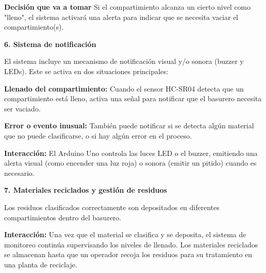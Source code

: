 	\textbf{Decisión que va a tomar} Si el compartimiento alcanza un cierto nivel como "lleno", el sistema activará una alerta para indicar que se necesita vaciar el compartimiento(s). 

	\textbf{6. Sistema de notificación} 

El sistema incluye un mecanismo de notificación visual y/o sonora (buzzer y LEDs). Este se activa en dos situaciones principales: 

    \textbf{Llenado del compartimiento:} Cuando el sensor HC-SR04 detecta que un compartimiento está lleno, activa una señal para notificar que el basurero necesita ser vaciado. 

	\textbf{Error o evento inusual:} También puede notificar si se detecta algún material que no puede clasificarse, o si hay algún error en el proceso. 

	\textbf{Interacción:} El Arduino Uno controla las luces LED o el buzzer, emitiendo una alerta visual (como encender una luz roja) o sonora (emitir un pitido) cuando es necesario. 

	\textbf{7. Materiales reciclados y gestión de residuos} 

Los residuos clasificados correctamente son depositados en diferentes compartimientos dentro del basurero. 

    \textbf{Interacción:} Una vez que el material se clasifica y se deposita, el sistema de monitoreo continúa supervisando los niveles de llenado. Los materiales reciclados se almacenan hasta que un operador recoja los residuos para su tratamiento en una planta de reciclaje. 

	\newpage